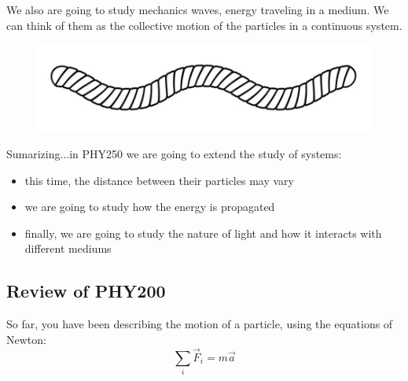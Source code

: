 \documentclass[]{beamer}
\begin{document}
  \begin{frame}

We also are going to study mechanics waves, energy traveling in a medium.
We can think of them as the collective motion of the particles in a continuous system.
    
      \begin{figure}[h!]
        \begin{center}
          \includegraphics[height=1.in]{images/oscillations.PNG}
        \end{center}
      \end{figure}
       
    
    
    \end{frame}

\begin{frame}
Sumarizing...in PHY250 we are going to extend the study of systems:

\vspace{5mm}

\pause
\begin{itemize}
  \item this time, the distance between their particles  may vary
  \pause
  \item we are going to study how the energy is propagated 
  \pause 
  \item finally, we are going to study the nature of light and how it interacts with different mediums 
\end{itemize}

  
    
\end{frame}


\subsection{Review of PHY200}

\begin{frame}

So far, you have been describing the motion of a particle, using the equations of Newton:
\pause
\vspace{5mm}
\begin{equation}
  \sum_i\vec{F}_i=m\vec{a}
\end{equation}


\end{frame}
\end{document}
